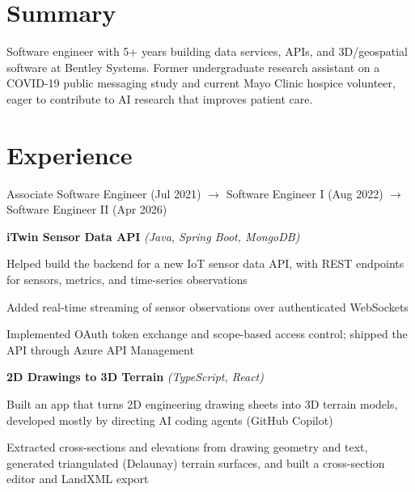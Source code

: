 \documentclass[]{deedy-resume-openfont}
\begin{document}
\hfill
%
%
\begin{minipage}[t]{0.66\textwidth}


\section{Summary}
Software engineer with 5+ years building data services, APIs, and 3D/geospatial software at Bentley Systems. Former undergraduate research assistant on a COVID-19 public messaging study and current Mayo Clinic hospice volunteer, eager to contribute to AI research that improves patient care.
\sectionsep


\section{Experience}

Associate Software Engineer (Jul 2021) $\rightarrow$ Software Engineer I (Aug 2022) $\rightarrow$ Software Engineer II (Apr 2026)
\vspace{6pt}


{\bf iTwin Sensor Data API} \textit{(Java, Spring Boot, MongoDB)}
\vspace{\topsep}
\begin{tightemize}
\item Helped build the backend for a new IoT sensor data API, with REST endpoints for sensors, metrics, and time-series observations
\item Added real-time streaming of sensor observations over authenticated WebSockets
\item Implemented OAuth token exchange and scope-based access control; shipped the API through Azure API Management
\end{tightemize}
\vspace{4pt}

{\bf 2D Drawings to 3D Terrain} \textit{(TypeScript, React)}
\begin{tightemize}
\item Built an app that turns 2D engineering drawing sheets into 3D terrain models, developed mostly by directing AI coding agents (GitHub Copilot)
\item Extracted cross-sections and elevations from drawing geometry and text, generated triangulated (Delaunay) terrain surfaces, and built a cross-section editor and LandXML export
\end{tightemize}
\vspace{4pt}


\end{minipage}
\end{document}
